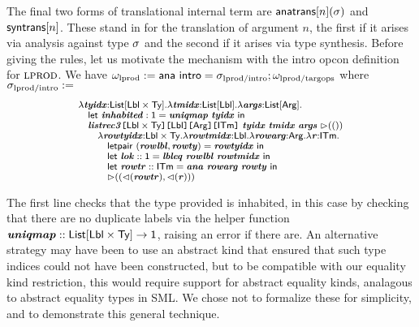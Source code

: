 \documentclass[10pt,preprint]{sigplanconf}
\begin{document}
The final two forms of translational internal term are ${\sf anatrans}[n](\sigma)$ and ${\sf syntrans}[n]$. These stand in for the translation of argument $n$, the first if it arises via analysis against type $\sigma$ and the second if it arises via type synthesis.  Before giving the rules, let us motivate the mechanism with the intro opcon definition for $\textsc{lprod}$. We have $\omega_\text{lprod} := {\sf ana}~{\sf intro}=\sigma_\text{lprod/intro}; \omega_\text{lprod/targops}$ where $\sigma_\text{lprod/intro} :=$
\[\small
\begin{array}{l}
\lambda\svar{tyidx}{:}\klist{\klbl\times\kty}.\lambda\svar{tmidx}{:}\klist{\klbl}.\lambda\svar{args}{:}\kargs.\\
\quad \keyw{let}~\svar{inhabited}:\kunit=\svar{uniqmap}~\svar{tyidx}~\keyw{in}\\
\quad \skap{\kitm}{\skap{\karg}{\skap{\klbl}{\skap{\klbl\times\kty}{\svar{listrec3}}}}}~\svar{tyidx}~\svar{tmidx}~\svar{args}~\sqitm{\itriv}\\
\quad\quad \lambda \svar{rowtyidx}{:}\klbl\times\kty.\lambda \svar{rowtmidx}{:}\klbl.\lambda\svar{rowarg}{:}\karg.\lambda \svar{r}{:}\kitm.\\
\quad\quad\quad \keyw{letpair}~(\svar{rowlbl}, \svar{rowty})=\svar{rowtyidx} ~\keyw{in}\\
\quad\quad\quad \keyw{let}~\svar{lok}::\kunit=\svar{lbleq}~\svar{rowlbl} ~\svar{rowtmidx}~\keyw{in}\\
\quad\quad\quad \keyw{let}~\svar{rowtr} :: \kitm = \svar{ana}~\svar{rowarg}~\svar{rowty}~\keyw{in}\\
\quad\quad\quad \sqitm{(\quq{\svar{rowtr}}, \quq{\svar{r}})
}\end{array}
\]

The first line checks that the type provided is inhabited, in this case by checking that there are no duplicate labels via the helper function ${\textbf{\textit{uniqmap}}} :: {\sf List}[{\sf Lbl} \times {\sf Ty}]\rightarrow {\sf 1}$, raising an error if there are. An alternative strategy may have been to use an abstract kind that ensured that such type indices could not have been constructed, but to be compatible with our equality kind restriction, this would require support for abstract equality kinds, analagous to abstract equality types in SML. We chose not to formalize these for simplicity, and to demonstrate this general technique. %
\end{document}
